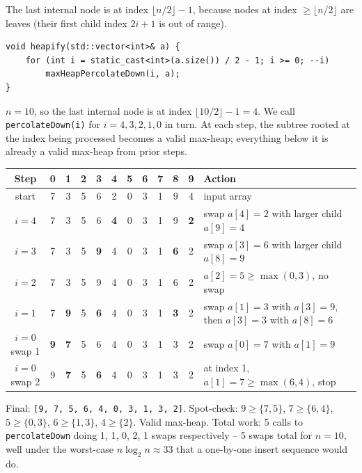 \documentclass[11pt]{article}
\begin{document}
The last internal node is at index $\lfloor n/2 \rfloor - 1$, because nodes at index $\ge \lfloor n/2 \rfloor$ are leaves (their first child index $2i + 1$ is out of range).

\begin{lstlisting}
void heapify(std::vector<int>& a) {
    for (int i = static_cast<int>(a.size()) / 2 - 1; i >= 0; --i)
        maxHeapPercolateDown(i, a);
}
\end{lstlisting}

\begin{examplebox}
$n = 10$, so the last internal node is at index $\lfloor 10/2 \rfloor -
1 = 4$. We call \texttt{percolateDown(i)} for $i = 4, 3, 2, 1, 0$ in
turn. At each step, the subtree rooted at the index being processed
becomes a valid max-heap; everything below it is already a valid
max-heap from prior steps.

\begin{center}
\begin{tabular}{|c|cccccccccc|l|}
\hline
Step & 0 & 1 & 2 & 3 & 4 & 5 & 6 & 7 & 8 & 9 & Action \\
\hline
start         & 7 & 3 & 5 & 6 & 2 & 0 & 3 & 1 & 9 & 4 & input array \\
$i=4$         & 7 & 3 & 5 & 6 & \textbf{4} & 0 & 3 & 1 & 9 & \textbf{2} & swap $a[4]=2$ with larger child $a[9]=4$ \\
$i=3$         & 7 & 3 & 5 & \textbf{9} & 4 & 0 & 3 & 1 & \textbf{6} & 2 & swap $a[3]=6$ with larger child $a[8]=9$ \\
$i=2$         & 7 & 3 & 5 & 9 & 4 & 0 & 3 & 1 & 6 & 2 & $a[2]=5 \ge \max(0,3)$, no swap \\
$i=1$         & 7 & \textbf{9} & 5 & \textbf{6} & 4 & 0 & 3 & 1 & \textbf{3} & 2 & swap $a[1]=3$ with $a[3]=9$, then $a[3]=3$ with $a[8]=6$ \\
$i=0$ swap 1  & \textbf{9} & \textbf{7} & 5 & 6 & 4 & 0 & 3 & 1 & 3 & 2 & swap $a[0]=7$ with $a[1]=9$ \\
$i=0$ swap 2  & 9 & \textbf{7} & 5 & \textbf{6} & 4 & 0 & 3 & 1 & 3 & 2 & at index 1, $a[1]=7 \ge \max(6,4)$, stop \\
\hline
\end{tabular}
\end{center}

Final: \texttt{[9, 7, 5, 6, 4, 0, 3, 1, 3, 2]}. Spot-check: $9 \ge
\{7, 5\}$, $7 \ge \{6, 4\}$, $5 \ge \{0, 3\}$, $6 \ge \{1, 3\}$, $4
\ge \{2\}$. Valid max-heap. Total work: 5 calls to
\texttt{percolateDown} doing 1, 1, 0, 2, 1 swaps respectively -- 5
swaps total for $n = 10$, well under the worst-case $n \log_2 n
\approx 33$ that a one-by-one insert sequence would do.
\end{examplebox}
\end{document}
